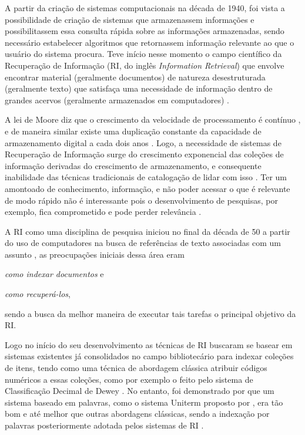     
    
    A partir da criação de sistemas computacionais na década de 1940, foi vista a possibilidade de criação de sistemas que armazenassem informações e possibilitassem essa consulta rápida sobre as informações armazenadas, sendo necessário estabelecer algoritmos que retornassem informação relevante ao que o usuário do sistema procura. 
    Teve início nesse momento o campo científico da Recuperação de Informação (RI, do inglês \textit{Information Retrieval}) que envolve encontrar material (geralmente documentos) de natureza desestruturada (geralmente texto) que satisfaça uma necessidade de informação dentro de grandes acervos (geralmente armazenados em computadores) \cite[p.~1]{Manning2008IIR}.
    
    A lei de Moore diz que o crescimento da velocidade de processamento é contínuo \cite{Moore1975}, e de maneira similar existe uma duplicação constante da capacidade de armazenamento digital a cada dois anos \cite{Kryder2005}. 
    Logo, a necessidade de sistemas de Recuperação de Informação surge do crescimento exponencial das coleções de informação derivadas do crescimento de armazenamento, e consequente inabilidade das técnicas tradicionais de catalogação de lidar com isso \cite{Sanderson2012THIRR}.
    Ter um amontoado de conhecimento, informação, e não poder acessar o que é relevante de modo rápido não é interessante pois o desenvolvimento de pesquisas, por exemplo, fica comprometido e pode perder relevância \cite{Bush:1979:WMT:1113634.1113638}.
    
    A RI como uma disciplina de pesquisa iniciou no final da década de 50 a partir do uso de computadores na busca de referências de texto associadas com um assunto \cite[p.~3]{Sanderson2012THIRR}, as preocupações iniciais dessa área eram 
    \begin{enumerate*}[label=(\alph*)]
    \item \textit{como indexar documentos} e \item \textit{como recuperá-los},
    \end{enumerate*}
    sendo a busca da melhor maneira de executar tais tarefas o principal objetivo da RI.
    
    Logo no início do seu desenvolvimento as técnicas de RI buscaram se basear em sistemas existentes já consolidados no campo bibliotecário para indexar coleções de itens, tendo como uma técnica de abordagem clássica atribuir códigos numéricos a essas coleções, como por exemplo o feito pelo sistema de Classificação Decimal de Dewey \cite[p.~1446]{Sanderson2012THIRR}.
    No entanto, foi demonstrado por  que um sistema baseado em palavras, como o sistema Uniterm proposto por , era tão bom e até melhor que outras abordagens clássicas, sendo a indexação por palavras posteriormente adotada pelos sistemas de RI \cite[p.~1446]{Sanderson2012THIRR}.
    
